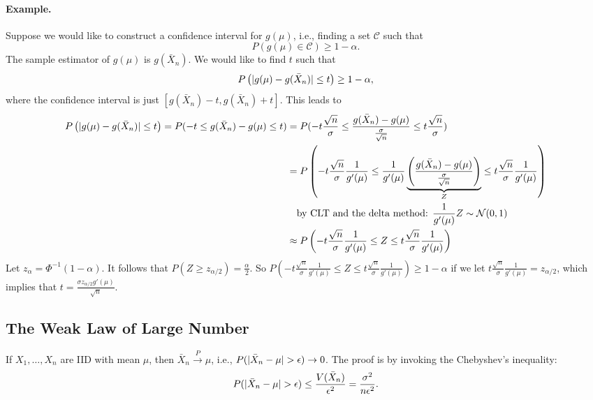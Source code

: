         \paragraph{Example.}
        Suppose we would like to construct a confidence interval for $g(\mu)$, i.e., finding a set $\mathcal{C}$ such that
            \begin{equation}
                P(g(\mu) \in \mathcal{C}) \ge 1 - \alpha.
            \end{equation}
        The sample estimator of $g(\mu)$ is $g(\bar{X}_n)$.
        We would like to find $t$ such that
            \begin{equation}
                P\left( | g(\mu) - g(\bar{X}_n) | \le t \right) \ge 1 - \alpha,
            \end{equation}
        where the confidence interval is just $[g(\bar{X}_n) -t, g(\bar{X}_n)+t]$.
        This leads to
            \begin{equation}
                \begin{aligned}
                P\left( | g(\mu) - g(\bar{X}_n) | \le t \right) = P(-t \le g(\bar{X}_n) - g(\mu) \le t) & = P(-t\frac{\sqrt{n}}{\sigma} \le \frac{g(\bar{X}_n) - g(\mu)}{\frac{\sigma}{\sqrt{n}}} \le t\frac{\sqrt{n} }{\sigma}) \\
                & = P\left(-t\frac{\sqrt{n}}{\sigma}\frac{1}{g'(\mu)} \le \frac{1}{g'(\mu)}\underbrace{\left( \frac{g(\bar{X}_n) - g(\mu)}{\frac{\sigma}{\sqrt{n}}} \right)}_{Z} \le t\frac{\sqrt{n} }{\sigma}\frac{1}{g'(\mu)}\right) \\
                & \quad \text{by CLT and the delta method: $\frac{1}{g'(\mu)}Z \sim \mathcal{N}(0, 1)$} \\
                & \approx P\left(-t\frac{\sqrt{n}}{\sigma}\frac{1}{g'(\mu)} \le Z \le t\frac{\sqrt{n}}{\sigma}\frac{1}{g'(\mu)} \right) \\
                \end{aligned}
            \end{equation}
        Let $z_{\alpha} = \Phi^{-1}(1 - \alpha)$. It follows that $P(Z \ge z_{\alpha / 2}) = \frac{\alpha}{2}$.
        So $P\left(-t\frac{\sqrt{n}}{\sigma}\frac{1}{g'(\mu)} \le Z \le t\frac{\sqrt{n}}{\sigma}\frac{1}{g'(\mu)} \right) \ge 1 - \alpha$ if we let $t\frac{\sqrt{n}}{\sigma}\frac{1}{g'(\mu)} = z_{\alpha/2}$, which implies that $t = \frac{\sigma z_{\alpha/2}g'(\mu)}{\sqrt{n}}$.
        
    
    \subsection{The Weak Law of Large Number}
        If $X_1, \ldots, X_n$ are IID with mean $\mu$, then $\bar{X}_n \xrightarrow{P} \mu$, i.e., $P(| \bar{X}_n - \mu | > \epsilon) \rightarrow 0$.
        The proof is by invoking the Chebyshev's inequality:
            \begin{equation}
                P(| \bar{X}_n - \mu | > \epsilon) \le \frac{V(\bar{X}_n)}{\epsilon^2} = \frac{ \sigma^2 }{n \epsilon^2}.
            \end{equation}
     
